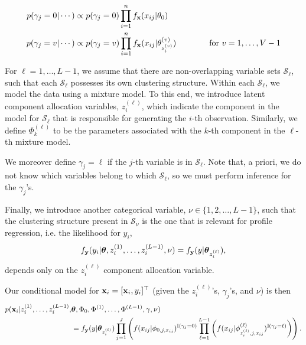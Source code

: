 \documentclass[12pt]{article}
\begin{document}
\begin{align*}
p(\gamma_j = 0 | \cdots) &\propto  p(\gamma_j = 0) \prod_{i=1}^n  f_{\bf x}( x_{ij} | \theta_{0})\\
p(\gamma_j = v | \cdots) &\propto  p(\gamma_j = v) \prod_{i=1}^n  f_{\bf x}( x_{ij} | \theta_{z_i^{(v)}}^{(v)}) \mbox{\qquad \qquad for $v = 1, \ldots, V-1$}\\
\end{align*}



For $\ell = 1, \ldots, L-1$, we assume that there are non-overlapping variable sets $\mathcal{S}_\ell$, such that each $\mathcal{S}_\ell$ possesses its own clustering structure.  Within each $\mathcal{S}_\ell$, we model the data using a mixture model.  To this end, we introduce latent component allocation variables, $z_i^{(\ell)}$, which indicate the component in the model for $\mathcal{S}_\ell$ that is responsible for generating the $i$-th observation.  Similarly, we define $\Phi_k^{(\ell)}$ to be the parameters associated with the $k$-th component in the $\ell$-th mixture model.   

We moreover define $\gamma_j = \ell$ if the $j$-th variable is in $\mathcal{S}_\ell$.   Note that, a priori, we do not know which variables belong to which $\mathcal{S}_\ell$, so we must perform inference for the $\gamma_j$'s.  


Finally, we introduce another categorical variable, $\nu \in  \{1, 2, \ldots, L-1\}$, such that the clustering structure present in $\mathcal{S}_\nu$ is the one that is relevant for profile regression, i.e. the likelihood for $y_i$, 
$$f_{\bf y}(y_i|\boldsymbol{\theta}, z_i^{(1)}, \ldots, z_i^{(L-1)}, \nu) = f_{\bf y}(y|\boldsymbol{\theta}_{z_i^{(\ell)}}),$$      
depends only on the $z_i^{(\ell)}$ component allocation variable. 

Our conditional model for ${\bf x}_i = [{\bf x}_i, y_i]^\top$ (given the $z_i^{(\ell)}$'s, $\gamma_j$'s, and $\nu$) is then
\begin{equation}
\begin{split}
p({\bf x}_i|z_i^{(1)}, \ldots, z_i^{(L-1)}, &\boldsymbol{\theta}, \Phi_0, \Phi^{(1)}, \ldots, \Phi^{(L-1)}, \gamma, \nu) \\
&=  f_{\bf y}(y|\boldsymbol{\theta}_{z_i^{(\ell)}})\prod_{j=1}^J\left( f(x_{ij}|\phi_{0, j, x_{ij}})^{\mathbb{I}(\gamma_j=0)}\prod_{\ell = 1}^{L-1}\left(f(x_{ij}|\phi^{(\ell)}_{z_i^{(\ell)}, j, x_{ij}})^{\mathbb{I}(\gamma_j=\ell)}\right)\right).
\end{split}
\end{equation}
\end{document}

